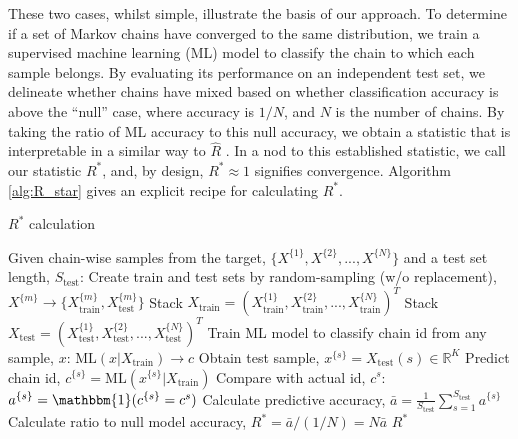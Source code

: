 \documentclass{article}
\begin{document}
These two cases, whilst simple, illustrate the basis of our approach. To determine if a set of Markov chains have converged to the same distribution, we train a supervised machine learning (ML) model to classify the chain to which each sample belongs. By evaluating its performance on an independent test set, we delineate whether chains have mixed based on whether classification accuracy is above the ``null'' case, where accuracy is $1/{N}$, and $N$ is the number of chains. By taking the ratio of ML accuracy to this null accuracy, we obtain a statistic that is interpretable in a similar way to $\hat{R}$ \cite{gelman2013bayesian}. In a nod to this established statistic, we call our statistic $R^*$, and, by design, $R^*\approx 1$ signifies convergence. Algorithm \ref{alg:R_star} gives an explicit recipe for calculating $R^*$.

\begin{algorithm}[tb]
	\caption{$R^*$ calculation}
	\label{alg:R_star}
	\begin{algorithmic}
		\STATE Given chain-wise samples from the target, $\{X^{\{1\}},X^{\{2\}},...,X^{\{N\}}\}$ and a test set length, $S_\text{test}$:
		\STATE Create train and test sets by random-sampling (w/o replacement), $X^{\{m\}}\rightarrow\{X^{\{m\}}_\text{train},X^{\{m\}}_\text{test}\}$
		\ENDFOR
		\STATE Stack $X_\text{train} = (X^{\{1\}}_\text{train},X^{\{2\}}_\text{train},...,X^{\{N\}}_\text{train})^T$
		\STATE Stack $X_\text{test} = (X^{\{1\}}_\text{test},X^{\{2\}}_\text{test},...,X^{\{N\}}_\text{test})^T$
		\STATE Train ML model to classify chain id from any sample, $x$: $\text{ML}(x|X_\text{train}) \rightarrow c$
		\STATE Obtain test sample, $x^{\{s\}}=X_\text{test}(s)\in \mathbb{R}^K$
		\STATE Predict chain id, $c^{\{s\}} = \text{ML}(x^{\{s\}}|X_\text{train})$
		\STATE Compare with actual id, $c^s$: $a^{\{s\}}=\mathbbm{1}(c^{\{s\}}=c^s)$
		\ENDFOR
		\STATE Calculate predictive accuracy, $\bar{a} = \frac{1}{S_\text{test}} \sum_{s=1}^{S_\text{test}} a^{\{s\}}$
		\STATE Calculate ratio to null model accuracy, $R^* = \bar{a} / (1 / N) = N \bar{a}$
		\RETURN $R^*$
	\end{algorithmic}
\end{algorithm}
\end{document}
